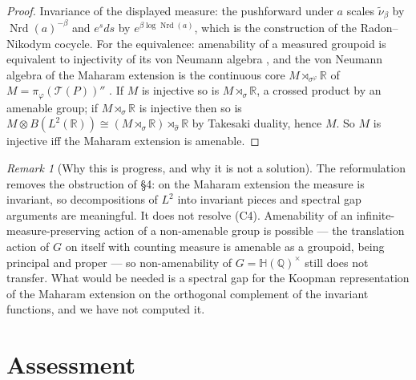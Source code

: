 \documentclass[11pt]{amsart}
\numberwithin{equation}{section}
\theoremstyle{definition}
\theoremstyle{remark}
\newtheorem{remark}[theorem]{Remark}
\newcommand{\Q}{\mathbb{Q}}
\newcommand{\R}{\mathbb{R}}
\newcommand{\HH}{\mathbb{H}}
\newcommand{\cT}{\mathcal{T}}
\newcommand{\Nrd}{\operatorname{Nrd}}
\begin{document}
\begin{proof}
Invariance of the displayed measure: the pushforward under $a$ scales $\tilde\nu_\beta$ by
$\Nrd(a)^{-\beta}$ and $e^sds$ by $e^{\beta\log\Nrd(a)}$, which is the construction of the
Radon--Nikodym cocycle. For
the equivalence: amenability of a measured groupoid is equivalent to injectivity of its
von Neumann algebra \cite{AD}, and the von Neumann algebra of the Maharam extension is the
continuous core $M\rtimes_{\sigma^\varphi}\R$ of $M=\pi_\varphi(\cT(P))''$ \cite[Ch.~XII]{Takesaki}.
If $M$ is injective so is $M\rtimes_{\sigma}\R$, a crossed product by an amenable group; if
$M\rtimes_\sigma\R$ is injective then so is $M\otimes B(L^2(\R))\cong(M\rtimes_\sigma\R)\rtimes_{\hat\sigma}\R$
by Takesaki duality, hence $M$. So $M$ is injective iff the Maharam extension is amenable.
\end{proof}

\begin{remark}[Why this is progress, and why it is not a solution]\label{rem:maharamstatus}
The reformulation removes the obstruction of \S4: on the Maharam extension the measure is
invariant, so decompositions of $L^2$ into invariant pieces and spectral gap arguments are
meaningful. It does not resolve (C4). Amenability of an infinite-measure-preserving action of
a non-amenable group is possible --- the translation action of $G$ on itself with counting
measure is amenable as a groupoid, being principal and proper --- so non-amenability of
$G=\HH(\Q)^\times$ still does not transfer. What would be needed is a spectral gap for the
Koopman representation of the Maharam extension on the orthogonal complement of the invariant
functions, and we have not computed it.
\end{remark}

\section{Assessment}
\end{document}

